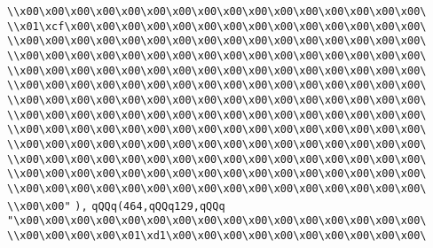 \verb|\\x00\x00\x00\x00\x00\x00\x00\x00\x00\x00\x00\x00\x00\x00\x00\x00\|\newline
\verb|\\x01\xcf\x00\x00\x00\x00\x00\x00\x00\x00\x00\x00\x00\x00\x00\x00\|\newline
\verb|\\x00\x00\x00\x00\x00\x00\x00\x00\x00\x00\x00\x00\x00\x00\x00\x00\|\newline
\verb|\\x00\x00\x00\x00\x00\x00\x00\x00\x00\x00\x00\x00\x00\x00\x00\x00\|\newline
\verb|\\x00\x00\x00\x00\x00\x00\x00\x00\x00\x00\x00\x00\x00\x00\x00\x00\|\newline
\verb|\\x00\x00\x00\x00\x00\x00\x00\x00\x00\x00\x00\x00\x00\x00\x00\x00\|\newline
\verb|\\x00\x00\x00\x00\x00\x00\x00\x00\x00\x00\x00\x00\x00\x00\x00\x00\|\newline
\verb|\\x00\x00\x00\x00\x00\x00\x00\x00\x00\x00\x00\x00\x00\x00\x00\x00\|\newline
\verb|\\x00\x00\x00\x00\x00\x00\x00\x00\x00\x00\x00\x00\x00\x00\x00\x00\|\newline
\verb|\\x00\x00\x00\x00\x00\x00\x00\x00\x00\x00\x00\x00\x00\x00\x00\x00\|\newline
\verb|\\x00\x00\x00\x00\x00\x00\x00\x00\x00\x00\x00\x00\x00\x00\x00\x00\|\newline
\verb|\\x00\x00\x00\x00\x00\x00\x00\x00\x00\x00\x00\x00\x00\x00\x00\x00\|\newline
\verb|\\x00\x00\x00\x00\x00\x00\x00\x00\x00\x00\x00\x00\x00\x00\x00\x00\|\newline
\verb|\\x00\x00"|\newline
\verb|),|\newline
\verb|qQQq(464,qQQq129,qQQq|\newline
\verb|"\x00\x00\x00\x00\x00\x00\x00\x00\x00\x00\x00\x00\x00\x00\x00\x00\|\newline
\verb|\\x00\x00\x00\x00\x01\xd1\x00\x00\x00\x00\x00\x00\x00\x00\x00\x00\|\newline
